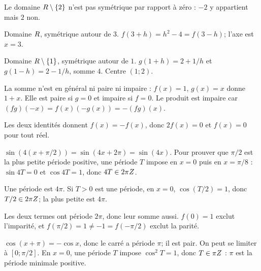 \begin{corrige}\label{sol-t11s-c01-e19}Le domaine $R\setminus\{2\}$ n’est pas symétrique par rapport à zéro : $-2$ y appartient mais $2$ non.
\end{corrige}
\begin{corrige}\label{sol-t11s-c01-e20}Domaine $R$, symétrique autour de $3$. $f(3+h)=h^2-4=f(3-h)$; l’axe est $x=3$.
\end{corrige}
\begin{corrige}\label{sol-t11s-c01-e21}Domaine $R\setminus\{1\}$, symétrique autour de $1$. $g(1+h)=2+1/h$ et $g(1-h)=2-1/h$, somme $4$. Centre $(1;2)$.
\end{corrige}
\begin{corrige}\label{sol-t11s-c01-e22}La somme n’est en général ni paire ni impaire : $f(x)=1$, $g(x)=x$ donne $1+x$. Elle est paire si $g=0$ et impaire si $f=0$. Le produit est impaire car $(fg)(-x)=f(x)(-g(x))=-(fg)(x)$.
\end{corrige}
\begin{corrige}\label{sol-t11s-c01-e23}Les deux identités donnent $f(x)=-f(x)$, donc $2f(x)=0$ et $f(x)=0$ pour tout réel.
\end{corrige}
\begin{corrige}\label{sol-t11s-c01-e24}$\sin(4(x+\pi/2))=\sin(4x+2\pi)=\sin(4x)$. Pour prouver que $\pi/2$ est la plus petite période positive, une période $T$ impose en $x=0$ puis en $x=\pi/8$ : $\sin4T=0$ et $\cos4T=1$, donc $4T\in2\pi Z$.
\end{corrige}
\begin{corrige}\label{sol-t11s-c01-e25}Une période est $4\pi$. Si $T>0$ est une période, en $x=0$, $\cos(T/2)=1$, donc $T/2\in2\pi Z$; la plus petite est $4\pi$.
\end{corrige}
\begin{corrige}\label{sol-t11s-c01-e26}Les deux termes ont période $2\pi$, donc leur somme aussi. $f(0)=1$ exclut l’imparité, et $f(\pi/2)=1\ne-1=f(-\pi/2)$ exclut la parité.
\end{corrige}
\begin{corrige}\label{sol-t11s-c01-e27}$\cos(x+\pi)=-\cos x$, donc le carré a période $\pi$; il est pair. On peut se limiter à $[0;\pi/2]$. En $x=0$, une période $T$ impose $\cos^2T=1$, donc $T\in\pi Z$ : $\pi$ est la période minimale positive.
\end{corrige}
